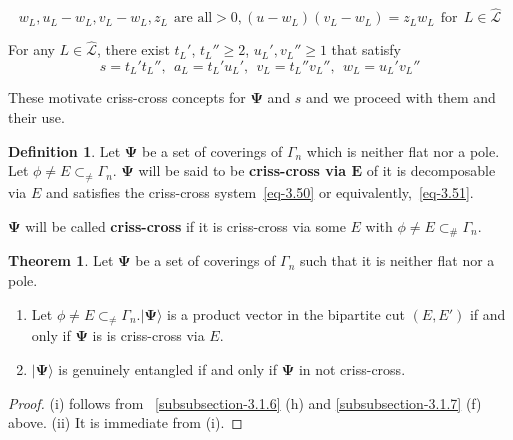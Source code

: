 \documentclass[a4paper,12pt]{article}
\theoremstyle{definition}
\theoremstyle{underlinethm}
\newtheorem{thm}{Theorem}[section]
\newtheorem{definition}{Definition}[section]
\theoremstyle{definition}
\begin{document}
\begin{enumerate}[label=(\alph*)]
\begin{equation}
w_{L}, u_{L}-w_{L}, v_{L}-w_{L}, z_{L}~~\text{are all} > 0, (u -w_{L})(v_{L}-w_{L}) =z_{L} w_{L}~~\text{for}~~ L \in \hat{\mathcal{L}}\tag{3.50}\label{eq-3.50}
\end{equation}
  
For any $L \in \hat{\mathcal{L}}$, there exist $t_{L}'$, $t_{L}'' \geq 2$, $u_{L}', v_{L}'' \geq 1$ that satisfy
\begin{equation}
s = t_{L}' t_{L}'',~~a_{L} = t_{L}' u_{L}',~~ v_{L} = t_{L}'' v_{L}'',~~ w_{L} =u_{L}' v_{L}''\tag{3.51}\label{eq-3.51}
\end{equation}   
  
  These motivate criss-cross concepts for $\boldsymbol{\Psi}$ and $s$ and we proceed with them and their use.
  
\end{enumerate}

\begin{definition}\label{definition-3.4}
Let $\boldsymbol{\Psi}$ be a set of coverings of $\Gamma_{n}$ which is neither flat nor a pole. Let $\phi  \neq E \subset_{\neq} \Gamma_{n}$. $\boldsymbol{\Psi}$ will be said to be \textbf{criss-cross via $\mathbf{E}$} of it is decomposable via $E$ and satisfies the criss-cross system~\eqref{eq-3.50} or equivalently,~\eqref{eq-3.51}.

$\boldsymbol{\Psi}$ will be called \textbf{criss-cross} if it is criss-cross via some $E$ with $\phi \neq E \subset_{\#} \Gamma_{n}$.

\end{definition}

\begin{thm}\label{thm-3.7}
Let $\boldsymbol{\Psi}$ be a set of coverings of $\Gamma_{n}$ such that it is neither flat nor a pole.
\begin{enumerate}[label=(\roman*)]
\item Let $\phi \neq E \subset_{\neq} \Gamma_{n}. | \boldsymbol{\Psi}\rangle$ is a product vector in the bipartite cut $(E, E')$ if and only if $\boldsymbol{\Psi}$ is is criss-cross via $E$.
\item $| \boldsymbol{\Psi} \rangle$ is genuinely entangled if and only if $\boldsymbol{\Psi}$ in not criss-cross.
\end{enumerate}

\end{thm}


\begin{proof}
(i) follows from ~\eqref{subsubsection-3.1.6} (h) and \eqref{subsubsection-3.1.7} (f) above. (ii) It is immediate from (i). 
\end{proof}
\end{document}
